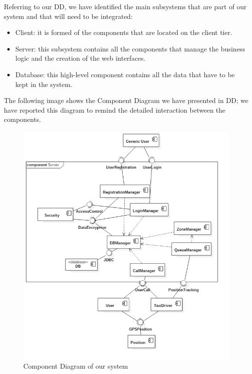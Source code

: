Referring to our DD, we have identified the main subsystems that are part of our system and that will need to be integrated:
\begin{itemize}
    \item Client: it is formed of the components that are located on the client tier.
    \item Server: this subsystem contains all the components that manage the business logic and the creation of the web interfaces.
    \item Database: this high-level component contains all the data that have to be kept in the system.
\end{itemize}

The following image shows the Component Diagram we have presented in DD; we have reported this diagram to remind the detailed interaction between the components.
\begin{figure}[H]
    \centering
    \includegraphics[width=12cm]{./Images/ComponentDiagram.png}
    \caption{Component Diagram of our system}
    \label{fig:component-diagram}
\end{figure}

